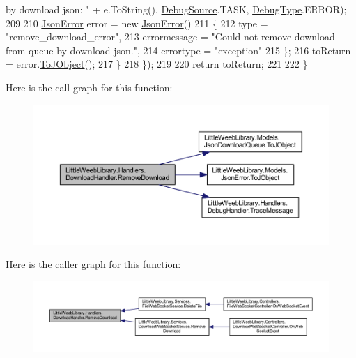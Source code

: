\begin{DoxyCode}
{       by download json: "} + e.ToString(), \mbox{\hyperlink{namespace_little_weeb_library_1_1_handlers_a2a6ca0775121c9c503d58aa254d292be}{DebugSource}}.TASK, \mbox{\hyperlink{namespace_little_weeb_library_1_1_handlers_ab66019ed40462876ec4e61bb3ccb0a62}{DebugType}}.ERROR);
209 
210                     \mbox{\hyperlink{class_little_weeb_library_1_1_models_1_1_json_error}{JsonError}} error = \textcolor{keyword}{new} \mbox{\hyperlink{class_little_weeb_library_1_1_models_1_1_json_error}{JsonError}}()
211                     \{
212                         type = \textcolor{stringliteral}{"remove\_download\_error"},
213                         errormessage = \textcolor{stringliteral}{"Could not remove download from queue by download json."},
214                         errortype = \textcolor{stringliteral}{"exception"}
215                     \};
216                     toReturn = error.\mbox{\hyperlink{class_little_weeb_library_1_1_models_1_1_json_error_a0623b835bb68d5d5e1f591df6a09dd81}{ToJObject}}();
217                 \}
218             \});
219 
220             \textcolor{keywordflow}{return} toReturn;
221 
222         \}
\end{DoxyCode}
Here is the call graph for this function\+:\nopagebreak
\begin{figure}[H]
\begin{center}
\leavevmode
\includegraphics[width=350pt]{class_little_weeb_library_1_1_handlers_1_1_download_handler_aac22841386d098daef366cbe05262187_cgraph}
\end{center}
\end{figure}
Here is the caller graph for this function\+:\nopagebreak
\begin{figure}[H]
\begin{center}
\leavevmode
\includegraphics[width=350pt]{class_little_weeb_library_1_1_handlers_1_1_download_handler_aac22841386d098daef366cbe05262187_icgraph}
\end{center}
\end{figure}
